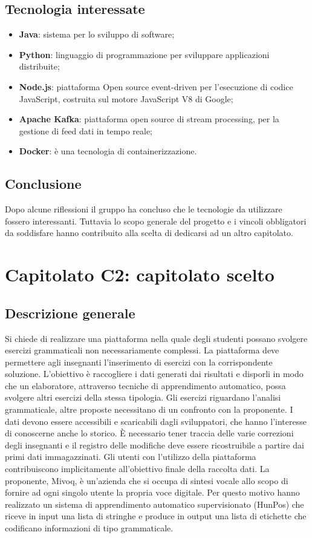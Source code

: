 \documentclass[11pt,a4paper]{article}
\begin{document}
	\subsection{Tecnologia interessate}
	\begin{itemize}
		\item \textbf{Java}: sistema per lo sviluppo di software;
		\item \textbf{Python}: linguaggio di programmazione per sviluppare applicazioni distribuite;
		\item \textbf{Node.js}: piattaforma Open source event-driven per l'esecuzione di codice JavaScript, costruita sul motore JavaScript V8 di Google;
		\item \textbf{Apache Kafka}: piattaforma open source di stream processing, per la gestione di feed dati in tempo reale;		
		\item \textbf{Docker}: è una tecnologia di containerizzazione.
	\end{itemize}
	\subsection{Conclusione}
	Dopo alcune riflessioni il gruppo ha concluso che le tecnologie da utilizzare fossero interessanti.
	Tuttavia lo scopo generale del progetto e i vincoli obbligatori da soddisfare hanno contribuito alla
	scelta di dedicarsi ad un altro capitolato.
	\newpage
	\section{Capitolato C2: capitolato scelto}
	\subsection{Descrizione generale}
	Si chiede di realizzare una piattaforma nella quale degli studenti possano svolgere esercizi grammaticali non necessariamente complessi. La piattaforma deve permettere agli insegnanti l'inserimento di esercizi con la corrispondente soluzione. L'obiettivo è raccogliere i dati generati dai risultati e disporli in modo che un elaboratore, attraverso tecniche di apprendimento automatico, possa svolgere altri esercizi della stessa tipologia. Gli esercizi riguardano l'analisi grammaticale, altre proposte necessitano di un confronto con la proponente. I dati devono essere accessibili e scaricabili dagli sviluppatori, che hanno l'interesse di conoscerne anche lo storico. È necessario tener traccia delle varie correzioni degli insegnanti e il registro delle modifiche deve essere ricostruibile a partire dai primi dati immagazzinati. Gli utenti con l'utilizzo della piattaforma contribuiscono implicitamente all'obiettivo finale della raccolta dati. La proponente, Mivoq, è un'azienda che si occupa di sintesi vocale allo scopo di fornire ad ogni singolo utente la propria voce digitale. Per questo motivo hanno realizzato un sistema di apprendimento automatico supervisionato (HunPos) che riceve in input una lista di stringhe e produce in output una lista di etichette che codificano informazioni di tipo grammaticale.
\end{document}
